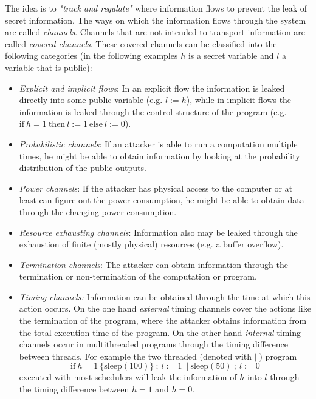 \documentclass[a4paper,10pt]{llncs}
\begin{document}
The idea is to \textit{"track and regulate"}\cite{Zdancewic04} where information flows to
prevent the leak of secret information. The ways on which the information flows
through the system are called \textit{channels}. Channels that are not intended to transport
information are called \textit{covered channels}. These covered channels can
be classified into the following categories \cite{Sabelfeld03} (in the following examples $h$ is a secret
variable and $l$ a variable that is public):

\begin{itemize}
\item \textit{Explicit and implicit flows}: In an explicit flow the information is leaked
      directly into some public variable (e.g. $l := h$), while in implicit flows the information
      is leaked through the control structure of the program (e.g. $\text{if}\ h = 1\ \text{then}\ l := 1\ \text{else}\ l := 0$).
\item \textit{Probabilistic channels}: If an attacker is able to run a computation multiple times,
      he might be able to obtain information by looking at the probability distribution of the
      public outputs.
\item \textit{Power channels}: If the attacker has physical access to the computer or at least can figure out
      the power consumption, he might be able to obtain data through the changing power consumption.
\item \textit{Resource exhausting channels}: Information also may be leaked through the exhaustion
      of finite (mostly physical) resources (e.g. a buffer overflow).
\item \textit{Termination channels}: The attacker can obtain information through the termination
      or non-termination of the computation or program.
\item \textit{Timing channels:} Information can be obtained through the time at which this action
      occurs. On the one hand \textit{external} timing channels cover the actions like the termination
      of the program, where the attacker obtains information from the total execution time of the program.
      On the other hand \textit{internal} timing channels occur in multithreaded programs through the timing difference
      between threads. For example the two threaded (denoted with $||$) program \[\text{if}\ h = 1\ \{\text{sleep}(100)\}\ ;\ l := 1\ ||\ \text{sleep}(50)\ ;\ l := 0\]
      executed with most schedulers will leak the information of $h$ into $l$ through the timing difference
      between $h = 1$ and $h = 0$.
\end{itemize}
\end{document}
